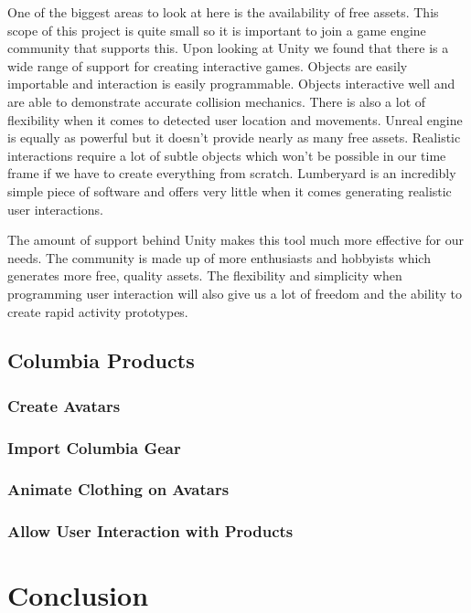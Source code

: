\documentclass[10pt,journal,compsoc,onecolumn, draftclsnofoot]{IEEEtran}
\begin{document}
One of the biggest areas to look at here is the availability of free assets.
This scope of this project is quite small so it is important to join a game engine community that supports this.
Upon looking at Unity we found that there is a wide range of support for creating interactive games.
Objects are easily importable and interaction is easily programmable.
Objects interactive well and are able to demonstrate accurate collision mechanics.
There is also a lot of flexibility when it comes to detected user location and movements.
Unreal engine is equally as powerful but it doesn’t provide nearly as many free assets.
Realistic interactions require a lot of subtle objects which won’t be possible in our time frame if we have to create everything from scratch.
Lumberyard is an incredibly simple piece of software and offers very little when it comes generating realistic user interactions.

The amount of support behind Unity makes this tool much more effective for our needs.
The community is made up of more enthusiasts and hobbyists which generates more free, quality assets.
The flexibility and simplicity when programming user interaction will also give us a lot of freedom and the ability to create rapid activity prototypes.
\vspace{2mm}


\subsection{Columbia Products}
\subsubsection{Create Avatars}

\subsubsection{Import Columbia Gear}

\subsubsection{Animate Clothing on Avatars}

\subsubsection{Allow User Interaction with Products}



\section{Conclusion}




\end{document}
